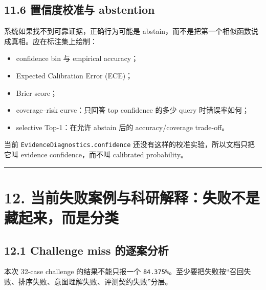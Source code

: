 \documentclass[UTF8,12pt,openany]{ctexbook}
\begin{document}
\subsection{11.6 置信度校准与 abstention}

系统如果找不到可靠证据，正确行为可能是 abstain，而不是把第一个相似函数说成真相。应在标注集上绘制：\par

\begin{itemize}
\item confidence bin 与 empirical accuracy；
\item Expected Calibration Error (ECE)；
\item Brier score；
\item coverage–risk curve：只回答 top confidence 的多少 query 时错误率如何；
\item selective Top-1：在允许 abstain 后的 accuracy/coverage trade-off。
\end{itemize}

当前 \texttt{EvidenceDiagnostics.confidence} 还没有这样的校准实验，所以文档只把它叫 evidence confidence，而不叫 calibrated probability。\par

\hrule

\section{12. 当前失败案例与科研解释：失败不是藏起来，而是分类}

\subsection{12.1 Challenge miss 的逐案分析}

本次 32-case challenge 的结果不能只报一个 \texttt{84.375\%}。至少要把失败按“召回失败、排序失败、意图理解失败、评测契约失败”分层。\par
\end{document}
